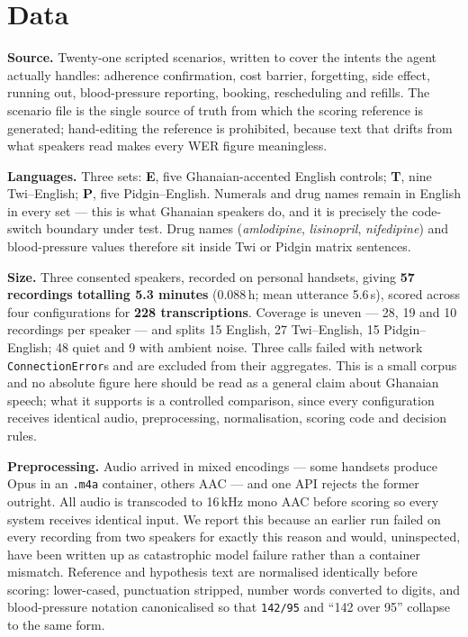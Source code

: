 \documentclass[a4paper,10pt,twocolumn]{article}
\begin{document}
\section{Data}

\textbf{Source.} Twenty-one scripted scenarios, written to cover the intents the
agent actually handles: adherence confirmation, cost barrier, forgetting, side
effect, running out, blood-pressure reporting, booking, rescheduling and refills.
The scenario file is the single source of truth from which the scoring reference
is generated; hand-editing the reference is prohibited, because text that drifts
from what speakers read makes every WER figure meaningless.

\textbf{Languages.} Three sets: \textbf{E}, five Ghanaian-accented English
controls; \textbf{T}, nine Twi--English; \textbf{P}, five Pidgin--English.
Numerals and drug names remain in English in every set --- this is what Ghanaian
speakers do, and it is precisely the code-switch boundary under test. Drug names
(\emph{amlodipine}, \emph{lisinopril}, \emph{nifedipine}) and blood-pressure
values therefore sit inside Twi or Pidgin matrix sentences.

\textbf{Size.} Three consented speakers, recorded on personal handsets, giving
\textbf{57 recordings totalling 5.3 minutes} (0.088\,h; mean utterance 5.6\,s),
scored across four configurations for \textbf{228 transcriptions}. Coverage is
uneven --- 28, 19 and 10 recordings per speaker --- and splits 15 English,
27 Twi--English, 15 Pidgin--English; 48 quiet and 9 with ambient noise. Three
calls failed with network \texttt{ConnectionError}s and are excluded from their
aggregates. This is a small corpus and no absolute figure here should be read as
a general claim about Ghanaian speech; what it supports is a controlled
comparison, since every configuration receives identical audio, preprocessing,
normalisation, scoring code and decision rules.

\textbf{Preprocessing.} Audio arrived in mixed encodings --- some handsets
produce Opus in an \texttt{.m4a} container, others AAC --- and one API rejects
the former outright. All audio is transcoded to 16\,kHz mono AAC before scoring
so every system receives identical input. We report this because an earlier run
failed on every recording from two speakers for exactly this reason and would,
uninspected, have been written up as catastrophic model failure rather than a
container mismatch. Reference and hypothesis text are normalised identically
before scoring: lower-cased, punctuation stripped, number words converted to
digits, and blood-pressure notation canonicalised so that \texttt{142/95} and
``142 over 95'' collapse to the same form.
\end{document}
